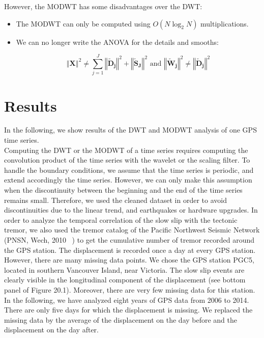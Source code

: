 \documentclass[main.tex]{subfiles}
\begin{document}
However, the MODWT has some disadvantages over the DWT:

\begin{itemize}
	\item The MODWT can only be computed using $O \left( N \log_2 N \right)$ multiplications.
	\item We can no longer write the ANOVA for the details and smooths:

\begin{equation}
\left\Vert \bm{X} \right\Vert ^2 \neq \sum_{j = 1}^{J} \left\Vert \bm{\widetilde{D}_j} \right\Vert ^2 + \left\Vert \bm{\widetilde{S}_J} \right\Vert ^2 \text{ and } \left\Vert \bm{\widetilde{W}_j} \right\Vert ^2 \neq \left\Vert \bm{\widetilde{D}_j} \right\Vert ^2
\end{equation}

\end{itemize}

\chapter{Results}

In the following, we show results of the DWT and MODWT analysis of one GPS time series. \\

Computing the DWT or the MODWT of a time series requires computing the convolution product of the time series with the wavelet or the scaling filter. To handle the boundary conditions, we assume that the time series is periodic, and extend accordingly the time series. However, we can only make this assumption when the discontinuity between the beginning and the end of the time series remains small. Therefore, we used the cleaned dataset in order to avoid discontinuities due to the linear trend, and earthquakes or hardware upgrades. In order to analyze the temporal correlation of the slow slip with the tectonic tremor, we also used the tremor catalog of the Pacific Northwest Seismic Network (PNSN, Wech, 2010 ~\cite{WEC_2010}) to get the cumulative number of tremor recorded around the GPS station. The displacement is recorded once a day at every GPS station. However, there are many missing data points. We chose the GPS station PGC5, located in southern Vancouver Island, near Victoria. The slow slip events are clearly visible in the longitudinal component of the displacement (see bottom panel of Figure 20.1). Moreover, there are very few missing data for this station. In the following, we have analyzed eight years of GPS data from 2006 to 2014. There are only five days for which the displacement is missing. We replaced the missing data by the average of the displacement on the day before and the displacement on the day after. \\
\end{document}
